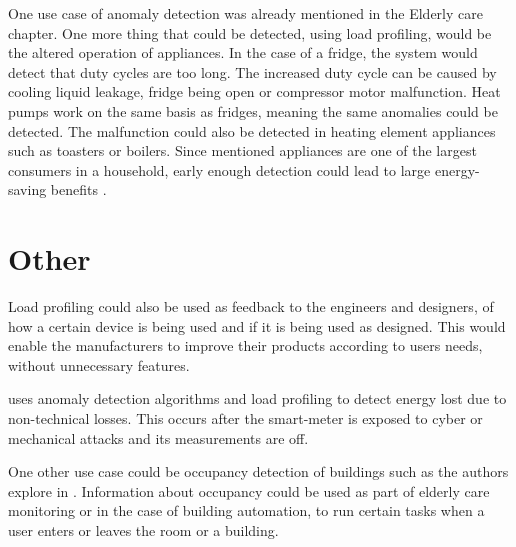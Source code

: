 One use case of anomaly detection was already mentioned in the Elderly care chapter.
One more thing that could be detected, using load profiling, would be the altered operation of appliances.
In the case of a fridge, the system would detect that duty cycles are too long.
The increased duty cycle can be caused by cooling liquid leakage, fridge being open or compressor motor malfunction.
Heat pumps work on the same basis as fridges, meaning the same anomalies could be detected. 
The malfunction could also be detected in heating element appliances such as toasters or boilers. 
Since mentioned appliances are one of the largest consumers in a household,
early enough detection could lead to large energy-saving benefits \cite{NILMAD2019}.

\section{Other}

Load profiling could also be used as feedback to the engineers and designers,
of how a certain device is being used and if it is being used as designed. 
This would enable the manufacturers to improve their products according to 
users needs, without unnecessary features.

\cite{energyStealing2018} uses anomaly detection algorithms and load profiling to detect energy lost due to non-technical losses.
This occurs after the smart-meter is exposed to cyber or mechanical attacks and its measurements are off. 

One other use case could be occupancy detection of buildings such as the authors explore in \cite{occupancy2013}. Information about 
occupancy could be used as part of elderly care monitoring or in the case of building
automation, to run certain tasks when a user enters or leaves the room or a building.